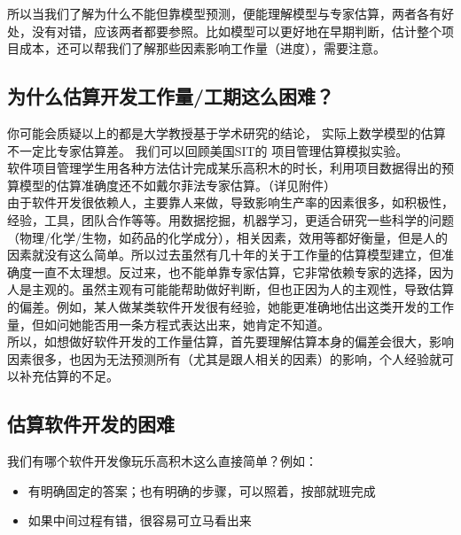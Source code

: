 所以当我们了解为什么不能但靠模型预测，便能理解模型与专家估算，两者各有好处，没有对错，应该两者都要参照。比如模型可以更好地在早期判断，估计整个项目成本，还可以帮我们了解那些因素影响工作量（进度），需要注意。\\

\hypertarget{ux4e3aux4ec0ux4e48ux4f30ux7b97ux5f00ux53d1ux5de5ux4f5cux91cfux5de5ux671fux8fd9ux4e48ux56f0ux96be}{%
\subsection{为什么估算开发工作量/工期这么困难？}\label{ux4e3aux4ec0ux4e48ux4f30ux7b97ux5f00ux53d1ux5de5ux4f5cux91cfux5de5ux671fux8fd9ux4e48ux56f0ux96be}}

你可能会质疑以上的都是大学教授基于学术研究的结论，
实际上数学模型的估算不一定比专家估算差。 我们可以回顾美国SIT的
项目管理估算模拟实验。\\
软件项目管理学生用各种方法估计完成某乐高积木的时长，利用项目数据得出的预算模型的估算准确度还不如戴尔菲法专家估算。（详见附件）\\
由于软件开发很依赖人，主要靠人来做，导致影响生产率的因素很多，如积极性，经验，工具，团队合作等等。用数据挖掘，机器学习，更适合研究一些科学的问题
（物理/化学/生物，如药品的化学成分），相关因素，效用等都好衡量，但是人的因素就没有这么简单。所以过去虽然有几十年的关于工作量的估算模型建立，但准确度一直不太理想。反过来，也不能单靠专家估算，它非常依赖专家的选择，因为人是主观的。虽然主观有可能能帮助做好判断，但也正因为人的主观性，导致估算的偏差。例如，某人做某类软件开发很有经验，她能更准确地估出这类开发的工作量，但如问她能否用一条方程式表达出来，她肯定不知道。\\
所以，如想做好软件开发的工作量估算，首先要理解估算本身的偏差会很大，影响因素很多，也因为无法预测所有（尤其是跟人相关的因素）的影响，个人经验就可以补充估算的不足。

\hypertarget{ux4f30ux7b97ux8f6fux4ef6ux5f00ux53d1ux7684ux56f0ux96be}{%
\subsection{估算软件开发的困难}\label{ux4f30ux7b97ux8f6fux4ef6ux5f00ux53d1ux7684ux56f0ux96be}}

我们有哪个软件开发像玩乐高积木这么直接简单？例如：

\begin{itemize}
\tightlist
\item
  有明确固定的答案；也有明确的步骤，可以照着，按部就班完成
\item
  如果中间过程有错，很容易可立马看出来
\end{itemize}


